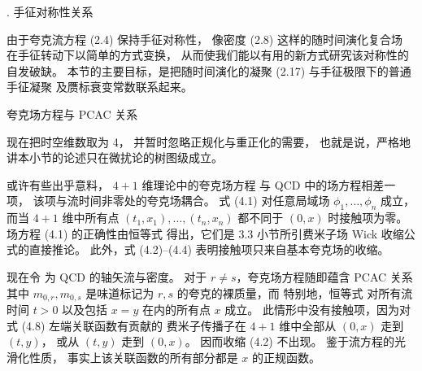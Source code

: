
. 手征对称性关系

由于夸克流方程 (2.4) 保持手征对称性，
像密度 (2.8) 这样的随时间演化复合场
在手征转动下以简单的方式变换，
从而使我们能以有用的新方式研究该对称性的自发破缺。
本节的主要目标，是把随时间演化的凝聚 (2.17)
与手征极限下的普通手征凝聚
及赝标衰变常数联系起来。


 夸克场方程与 PCAC 关系

现在把时空维数取为 4，
并暂时忽略正规化与重正化的需要，
也就是说，严格地讲本小节的论述只在微扰论的树图级成立。

或许有些出乎意料，
$4+1$ 维理论中的夸克场方程
与 QCD 中的场方程相差一项，
该项与流时间非零处的夸克场耦合。
式 (4.1) 对任意局域场 $\phi_1,\ldots,\phi_n$ 成立，
而当 $4+1$ 维中所有点 $(t_1,x_1),\ldots,(t_n,x_n)$
都不同于 $(0,x)$ 时接触项为零。
场方程 (4.1) 的正确性由恒等式
得出，它们是 3.3 小节所引费米子场 Wick 收缩公式的直接推论。
此外，式 (4.2)--(4.4) 表明接触项只来自基本夸克场的收缩。

现在令
为 QCD 的轴矢流与密度。
对于 $r\neq s$，夸克场方程随即蕴含 PCAC 关系
其中 $m_{0,r},m_{0,s}$ 是味道标记为 $r,s$ 的夸克的裸质量，而
特别地，恒等式
对所有流时间 $t>0$ 以及包括 $x=y$ 在内的所有点 $x$ 成立。
此情形中没有接触项，因为对式 (4.8) 左端关联函数有贡献的
费米子传播子在 $4+1$ 维中全部从 $(0,x)$ 走到 $(t,y)$，
或从 $(t,y)$ 走到 $(0,x)$。
因而收缩 (4.2) 不出现。
鉴于流方程的光滑化性质，
事实上该关联函数的所有部分都是 $x$ 的正规函数。

